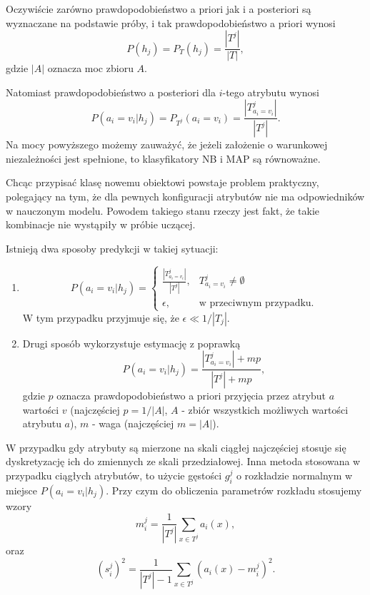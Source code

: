 \documentclass[]{book}
\providecommand{\tightlist}{%
  \setlength{\itemsep}{0pt}\setlength{\parskip}{0pt}}
\theoremstyle{plain}
\theoremstyle{definition}
\theoremstyle{definition}
\theoremstyle{definition}
\theoremstyle{definition}
\theoremstyle{remark}
\begin{document}
Oczywiście zarówno prawdopodobieństwo a priori jak i a posteriori są wyznaczane na podstawie próby, i tak prawdopodobieństwo a priori wynosi
\begin{equation}\label{apriori}
        P(h_j)=P_T(h_j)=\frac{|T^j|}{|T|}, 
\end{equation}
gdzie \(|A|\) oznacza moc zbioru \(A\).

Natomiast prawdopodobieństwo a posteriori dla \(i\)-tego atrybutu wynosi
\begin{equation}\label{aposteriori}
        P(a_i=v_i|h_j)=P_{T^j}(a_i=v_i)=\frac{|T^j_{a_i=v_i}|}{|T^j|}.
\end{equation}
Na mocy powyższego możemy zauważyć, że jeżeli założenie o warunkowej niezależności jest spełnione, to klasyfikatory NB i MAP są równoważne.

Chcąc przypisać klasę nowemu obiektowi powstaje problem praktyczny, polegający na tym, że dla pewnych konfiguracji atrybutów nie ma odpowiedników w nauczonym modelu. Powodem takiego stanu rzeczy jest fakt, że takie kombinacje nie wystąpiły w próbie uczącej.

Istnieją dwa sposoby predykcji w takiej sytuacji:

\begin{enumerate}
\def\labelenumi{\arabic{enumi}.}
\tightlist
\item
  \begin{equation}\label{pred1}
           P(a_i=v_i|h_j)=
           \begin{cases}
               \frac{|T^j_{a_i=v_i}|}{|T^j|}, & T^j_{a_i=v_i}\neq \emptyset\\
               \epsilon, & \text{w przeciwnym przypadku.}
           \end{cases}
   \end{equation}
  W tym przypadku przyjmuje się, że \(\epsilon \ll 1/|T_j|\).
\item
  Drugi sposób wykorzystuje estymację z poprawką
  \begin{equation}\label{pred2}
       P(a_i=v_i|h_j)=\frac{|T^j_{a_i=v_i}|+mp}{|T^j|+mp},
  \end{equation}
  gdzie \(p\) oznacza prawdopodobieństwo a priori przyjęcia przez atrybut \(a\) wartości \(v\) (najczęściej \(p=1/|A|\), \(A\) - zbiór wszystkich możliwych wartości atrybutu \(a\)), \(m\) - waga (najczęściej \(m=|A|\)).
\end{enumerate}

W przypadku gdy atrybuty są mierzone na skali ciągłej najczęściej stosuje się dyskretyzację ich do zmiennych ze skali przedziałowej. Inna metoda stosowana w przypadku ciągłych atrybutów, to użycie gęstości \(g_i^j\) o rozkładzie normalnym w miejsce \(P(a_i=v_i|h_j)\). Przy czym do obliczenia parametrów rozkładu stosujemy wzory
\begin{equation}\label{sred}
        m_i^j=\frac{1}{|T^j|}\sum_{x\in T^j}a_i(x),
\end{equation}
oraz
\begin{equation}\label{odch}
        (s_i^j)^2=\frac{1}{|T^j|-1}\sum_{x\in T^j}(a_i(x)-m_i^j)^2.
\end{equation}
\end{document}

